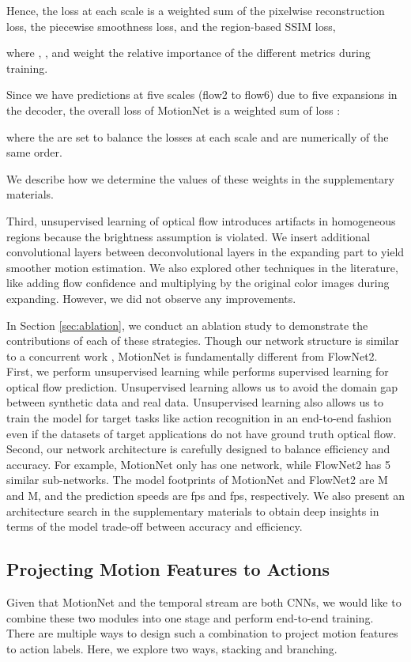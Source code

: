 \documentclass[runningheads]{llncs}
\begin{document}
		{\color{black} Hence, the loss at each scale } is a weighted sum of the pixelwise reconstruction loss, the piecewise smoothness loss, and the region-based SSIM loss, 
		
		where , , and  weight the relative importance of the different metrics during training. 
		{\color{black}Since we have predictions at five scales (flow2 to flow6) due to five expansions in the decoder, the overall loss of MotionNet is a weighted sum of loss : 
			
			where the  are set to balance the losses at each scale and are numerically of the same order.} We describe how we determine the values of these weights in the supplementary materials.
		
		Third, unsupervised learning of optical flow introduces artifacts in homogeneous regions because the brightness assumption is violated. We insert additional convolutional layers between deconvolutional layers in the expanding part to yield smoother motion estimation.  We also explored other techniques in the literature, like adding flow confidence and multiplying by the original color images \cite{flownet2} during expanding. However, we did not observe any improvements. 
		
		In Section \ref{sec:ablation}, we conduct an ablation study to demonstrate the contributions of each of these strategies. Though our network structure is similar to a concurrent work \cite{flownet2}, MotionNet is fundamentally different from FlowNet2. First, we perform unsupervised learning while \cite{flownet2} performs supervised learning for optical flow prediction. Unsupervised learning allows us to avoid the domain gap between synthetic data and real data. Unsupervised learning also allows us to train the model for target tasks like action recognition in an end-to-end fashion even if the datasets of target applications do not have ground truth optical flow. 
		Second, our network architecture is carefully designed to balance efficiency and accuracy. For example, MotionNet only has one network, while FlowNet2 has 5 similar sub-networks. The model footprints of MotionNet and FlowNet2 \cite{flownet2} are M and M, and the prediction speeds are fps and fps, respectively. We also present an architecture search in the supplementary materials to obtain deep insights in terms of the model trade-off between accuracy and efficiency. 


		\subsection{Projecting Motion Features to Actions}
		\label{sec:stacked}
		Given that MotionNet and the temporal stream are both CNNs, we would like to combine these two modules into one stage and perform end-to-end training. There are multiple ways to design such a combination to project motion features to action labels. Here, we explore two ways, stacking and branching. 
		
\end{document}
